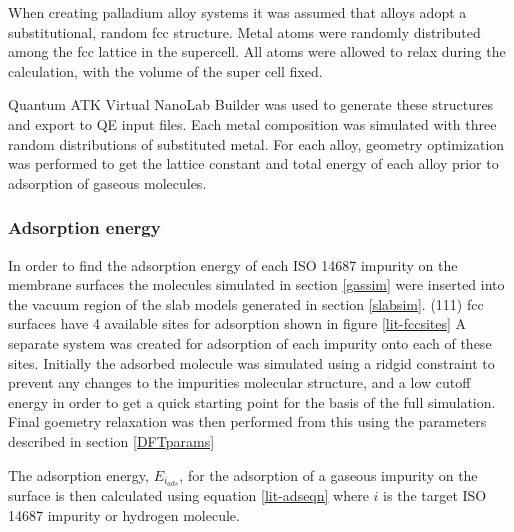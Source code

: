 When creating palladium alloy systems it was assumed that alloys adopt a substitutional, random fcc structure. Metal atoms were randomly distributed among the fcc lattice in the supercell. All atoms were allowed to relax during the calculation, with the volume of the super cell fixed. 

Quantum ATK Virtual NanoLab Builder \cite{synopsys} was used to generate these structures and export to QE input files. Each metal composition was simulated with three random distributions of substituted metal. For each alloy, geometry optimization was performed to get the lattice constant and total energy of each alloy prior to adsorption of gaseous molecules.

\subsubsection{Adsorption energy}
In order to find the adsorption energy of each ISO 14687 impurity on the membrane surfaces the molecules simulated in section \ref{gassim} were inserted into the vacuum region of the slab models generated in section \ref{slabsim}. (111) fcc surfaces have 4 available sites for adsorption shown in figure \ref{lit-fccsites} A separate system was created for adsorption of each impurity onto each of these sites. Initially the adsorbed molecule was simulated using a ridgid constraint to prevent any changes to the impurities molecular structure, and a low cutoff energy in order to get a quick starting point for the basis of the full simulation. Final goemetry relaxation was then performed from this using the parameters described in section \ref{DFTparams}

The adsorption energy, $E_{i_{ads}}$, for the adsorption of a gaseous impurity on the surface is then calculated using equation \ref{lit-adseqn} where $i$ is the target ISO 14687 impurity or hydrogen molecule.



\renewcommand{\bibname}{References}

